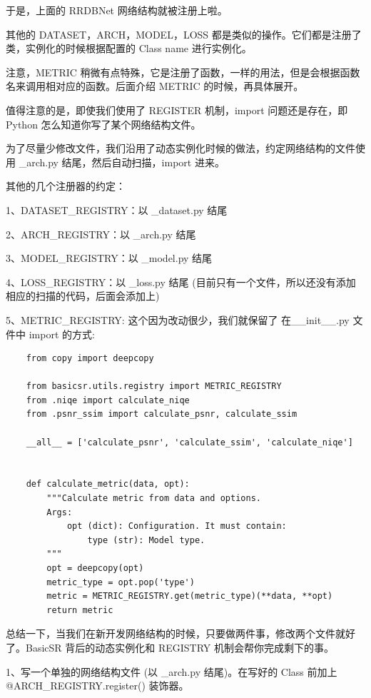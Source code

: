 \documentclass[../main.tex]{subfiles}
\begin{document}
	于是，上面的 RRDBNet 网络结构就被注册上啦。

    其他的 DATASET，ARCH，MODEL，LOSS 都是类似的操作。它们都是注册了类，实例化的时候根据配置的 Class name 进行实例化。
    
    注意，METRIC 稍微有点特殊，它是注册了函数，一样的用法，但是会根据函数名来调用相对应的函数。后面介绍 METRIC 的时候，再具体展开。
    
    值得注意的是，即使我们使用了 REGISTER 机制，import 问题还是存在，即 Python 怎么知道你写了某个网络结构文件。
    
    为了尽量少修改文件，我们沿用了动态实例化时候的做法，约定网络结构的文件使用  \_arch.py 结尾，然后自动扫描，import 进来。
    
    其他的几个注册器的约定：

    1、DATASET\_REGISTRY：以 \_dataset.py 结尾
    
    2、ARCH\_REGISTRY：以 \_arch.py 结尾
    
    3、MODEL\_REGISTRY：以 \_model.py 结尾
    
    4、LOSS\_REGISTRY：以 \_loss.py 结尾 (目前只有一个文件，所以还没有添加相应的扫描的代码，后面会添加上)
    
    5、METRIC\_REGISTRY: 这个因为改动很少，我们就保留了 在\_\_init\_\_.py 文件中 import 的方式:
    \begin{verbatim}
    from copy import deepcopy

    from basicsr.utils.registry import METRIC_REGISTRY
    from .niqe import calculate_niqe
    from .psnr_ssim import calculate_psnr, calculate_ssim
    
    __all__ = ['calculate_psnr', 'calculate_ssim', 'calculate_niqe']
    
    
    def calculate_metric(data, opt):
        """Calculate metric from data and options.
        Args:
            opt (dict): Configuration. It must contain:
                type (str): Model type.
        """
        opt = deepcopy(opt)
        metric_type = opt.pop('type')
        metric = METRIC_REGISTRY.get(metric_type)(**data, **opt)
        return metric
	\end{verbatim}

    总结一下，当我们在新开发网络结构的时候，只要做两件事，修改两个文件就好了。BasicSR 背后的动态实例化和 REGISTRY 机制会帮你完成剩下的事。

    1、写一个单独的网络结构文件 (以 \_arch.py 结尾)。在写好的 Class 前加上 @ARCH\_REGISTRY.register() 装饰器。
    
\end{document}
